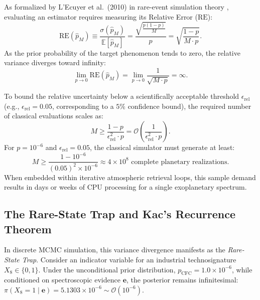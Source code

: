 As formalized by L'Ecuyer et al.~(2010) in rare-event simulation theory \cite{lecuyer2010}, evaluating an estimator requires measuring its Relative Error ($\mathrm{RE}$):
\begin{equation}
\mathrm{RE}(\hat{p}_M) \equiv \frac{\sigma(\hat{p}_M)}{\mathbb{E}[\hat{p}_M]} = \frac{\sqrt{\frac{p(1-p)}{M}}}{p} = \sqrt{\frac{1-p}{M \cdot p}}.
\label{eq:lecuyer_theorem_ch2}
\end{equation}
As the prior probability of the target phenomenon tends to zero, the relative variance diverges toward infinity:
\begin{equation}
\lim_{p \to 0} \mathrm{RE}(\hat{p}_M) = \lim_{p \to 0} \frac{1}{\sqrt{M \cdot p}} = \infty.
\label{eq:lecuyer_limit_divergence}
\end{equation}

To bound the relative uncertainty below a scientifically acceptable threshold $\epsilon_{\mathrm{rel}}$ (e.g., $\epsilon_{\mathrm{rel}} = 0.05$, corresponding to a $5\%$ confidence bound), the required number of classical evaluations scales as:
\begin{equation}
M \ge \frac{1-p}{\epsilon_{\mathrm{rel}}^2 \cdot p} = \mathcal{O}\left(\frac{1}{\epsilon_{\mathrm{rel}}^2 \cdot p}\right).
\label{eq:sample_requirement_lecuyer}
\end{equation}
For $p = 10^{-6}$ and $\epsilon_{\mathrm{rel}} = 0.05$, the classical simulator must generate at least:
\begin{equation}
M \ge \frac{1 - 10^{-6}}{(0.05)^2 \times 10^{-6}} \approx 4 \times 10^8 \text{ complete planetary realizations}.
\end{equation}
When embedded within iterative atmospheric retrieval loops, this sample demand results in days or weeks of CPU processing for a single exoplanetary spectrum.

\subsection{The Rare-State Trap and Kac's Recurrence Theorem}
In discrete MCMC simulation, this variance divergence manifests as the \emph{Rare-State Trap}. Consider an indicator variable for an industrial technosignature $X_8 \in \{0, 1\}$. Under the unconditional prior distribution, $p_{\mathrm{CFC}} = 1.0 \times 10^{-6}$, while conditioned on spectroscopic evidence $\mathbf{e}$, the posterior remains infinitesimal: $\pi(X_8 = 1 \mid \mathbf{e}) = 5.1303 \times 10^{-6} \sim \mathcal{O}(10^{-6})$.

